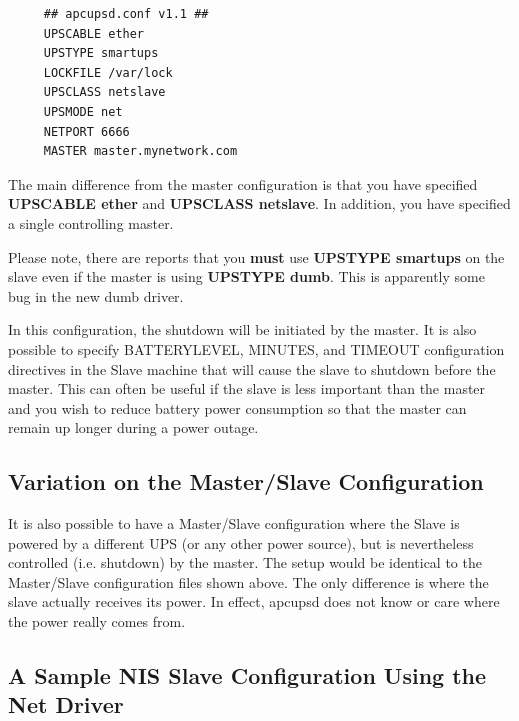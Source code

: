 \footnotesize
\begin{verbatim}
     ## apcupsd.conf v1.1 ##
     UPSCABLE ether
     UPSTYPE smartups
     LOCKFILE /var/lock
     UPSCLASS netslave
     UPSMODE net
     NETPORT 6666
     MASTER master.mynetwork.com
\end{verbatim}
\normalsize

The main difference from the master configuration is that you have specified
{\bf UPSCABLE ether} and {\bf UPSCLASS netslave}.  In addition, you have
specified a single controlling master.  

Please note, there are reports that you {\bf must} use {\bf UPSTYPE smartups}
on the slave even if the master is using {\bf UPSTYPE dumb}. This is
apparently some bug in the new dumb driver.  

In this configuration, the shutdown will be initiated by the master. It is
also possible to specify BATTERYLEVEL, MINUTES, and TIMEOUT configuration
directives in the Slave machine that will cause the slave to shutdown before
the master. This can often be useful if the slave is less important than the
master and you wish to reduce battery power consumption so that the master can
remain up longer during a power outage. 

\label{Variation-on-the-Master_002fSlave-Configuration}

\subsection*{Variation on the Master/Slave Configuration}

\label{index-Master_002fSlave-variation-80}
It is also possible to have a Master/Slave configuration where the Slave is
powered by a different UPS (or any other power source), but is nevertheless
controlled (i.e.  shutdown) by the master.  The setup would be identical to
the Master/Slave configuration files shown above.  The only difference is
where the slave actually receives its power.  In effect, apcupsd does not know
or care where the power really comes from. 

\label{A-Sample-NIS-Slave-Configuration-Using-the-Net-Driver}

\subsection*{A Sample NIS Slave Configuration Using the Net Driver}

